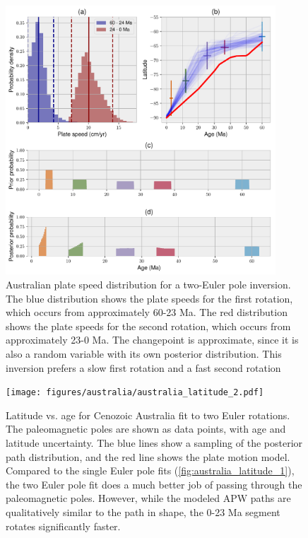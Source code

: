 \documentclass[preprint,12pt,authoryear]{elsarticle}
\begin{document}
\begin{figure}
\includegraphics[width=0.9\textwidth]{figures/australia/australia_speeds_2.pdf}
\caption[Australian plate speed distribution for a two-Euler pole inversion]{Australian plate speed distribution for a two-Euler pole inversion. The blue distribution shows the plate speeds for the first rotation, which occurs from approximately 60-23 Ma. The red distribution shows the plate speeds for the second rotation, which occurs from approximately 23-0 Ma. The changepoint is approximate, since it is also a random variable with its own posterior distribution. This inversion prefers a slow first rotation and a fast second rotation}
\label{fig:australia_speeds_2}
\end{figure}
\begin{figure}
\texttt{[image: figures/australia/australia\_latitude\_2.pdf]}
\caption[Latitude vs. age for Cenozoic Australia fit to two Euler rotations]{Latitude vs. age for Cenozoic Australia fit to two Euler rotations. The paleomagnetic poles are shown as data points, with age and latitude uncertainty. The blue lines show a sampling of the posterior path distribution, and the red line shows the \citet{seton2012global} plate motion model. Compared to the single Euler pole fits (\ref{fig:australia_latitude_1}), the two Euler pole fit does a much better job of passing through the paleomagnetic poles. However, while the modeled APW paths are qualitatively similar to the \citet{seton2012global} path in shape, the 0-23 Ma segment rotates significantly faster.}
\label{fig:australia_latitude_2}
\end{figure}
\end{document}
